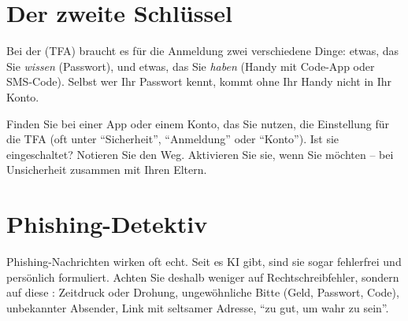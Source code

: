 \section{Der zweite Schlüssel}

Bei der  (\acrshort{TFA}) braucht es für die Anmeldung zwei verschiedene Dinge:
etwas, das Sie \emph{wissen} (Passwort), und etwas, das Sie \emph{haben} (Handy mit Code-App oder SMS-Code).
Selbst wer Ihr Passwort kennt, kommt ohne Ihr Handy nicht in Ihr Konto.

\begin{myexercise}
	Finden Sie bei einer App oder einem Konto, das Sie nutzen, die Einstellung für die \gls{TFA}
	(oft unter \enquote{Sicherheit}, \enquote{Anmeldung} oder \enquote{Konto}). Ist sie eingeschaltet?
	Notieren Sie den Weg. Aktivieren Sie sie, wenn Sie möchten -- bei Unsicherheit zusammen mit Ihren Eltern.
	\schreibzeile
\end{myexercise}

\section{Phishing-Detektiv}

Phishing-Nachrichten wirken oft echt. Seit es \gls{KI} gibt, sind sie sogar fehlerfrei und persönlich formuliert.
Achten Sie deshalb weniger auf Rechtschreibfehler, sondern auf diese :
Zeitdruck oder Drohung, ungewöhnliche Bitte (Geld, Passwort, Code), unbekannter Absender, Link mit seltsamer Adresse, \enquote{zu gut, um wahr zu sein}.

